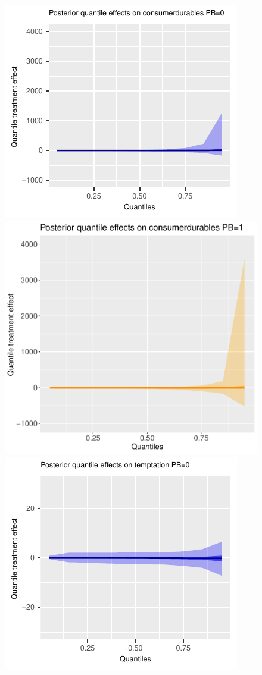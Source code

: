 \documentclass[english,12pt]{article}\usepackage{lmodern}
\numberwithin{equation}{section}
\begin{document}
\begin{figure}[h!]
    \includegraphics[scale=0.4]{posterior_parent_quantile_TEs_consumerdurables_pb_0_lognormal.pdf}
    \includegraphics[scale=0.4]{posterior_parent_quantile_TEs_consumerdurables_pb_1_lognormal.pdf}\\
    \includegraphics[scale=0.4]{posterior_parent_quantile_TEs_temptation_pb_0_lognormal.pdf}

\end{figure}
\end{document}
